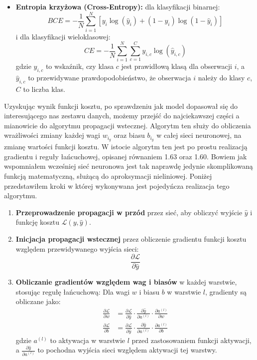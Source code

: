 \begin{enumerate}
\begin{itemize}
    \item \textbf{Entropia krzyżowa (Cross-Entropy):} dla klasyfikacji binarnej:
    \[ BCE = -\frac{1}{N} \sum_{i=1}^{N} [y_i \log(\hat{y}_i) + (1 - y_i) \log(1 - \hat{y}_i)] \]
    i dla klasyfikacji wieloklasowej:
    \[ CE = -\frac{1}{N} \sum_{i=1}^{N} \sum_{c=1}^{C} y_{i,c} \log(\hat{y}_{i,c}) \]
    gdzie $y_{i,c}$ to wskaźnik, czy klasa $c$ jest prawidłową klasą dla obserwacji $i$, a $\hat{y}_{i,c}$ to przewidywane prawdopodobieństwo, że obserwacja $i$ należy do klasy $c$, $C$ to liczba klas.
\end{itemize}
Uzyskując wynik funkcji kosztu, po sprawdzeniu jak model dopasował się do interesującego nas zestawu danych, możemy przejść do najciekawszej części a mianowicie do algorytmu propagacji wstecznej. Algorytm ten służy do obliczenia wrażliwości zmiany każdej wagi $w_i_g$ oraz biasu $b_i_g$ w całej sieci neuronowej, na zmianę wartości funkcji kosztu. W istocie algorytm ten jest po prostu realizacją gradientu i reguły łańcuchowej, opisanej równaniem 1.63 oraz 1.60. Bowiem jak wspomniałem wcześniej sieć neuronowa jest tak naprawdę jedynie skomplikowaną funkcją matematyczną, służącą do aproksymacji nieliniowej. Poniżej przedstawiłem kroki w której wykonywana jest pojedyńcza realizacja tego algorytmu. 
\begin{enumerate}[label=\textbf{Krok \arabic*:}]
    \item \textbf{Przeprowadzenie propagacji w przód} przez sieć, aby obliczyć wyjście \(\hat{y}\) i funkcję kosztu \(\mathcal{L}(y, \hat{y})\).

    \item \textbf{Inicjacja propagacji wstecznej} przez obliczenie gradientu funkcji kosztu względem przewidywanego wyjścia sieci:
    \begin{equation*}
    \frac{\partial \mathcal{L}}{\partial \hat{y}}
    \end{equation*}

    \item \textbf{Obliczanie gradientów względem wag i biasów} w każdej warstwie, stosując regułę łańcuchową:
    Dla wagi \(w\) i biasu \(b\) w warstwie \(l\), gradienty są obliczane jako:
    \begin{align*}
    \frac{\partial \mathcal{L}}{\partial w} &= \frac{\partial \mathcal{L}}{\partial \hat{y}} \cdot \frac{\partial \hat{y}}{\partial a^{(l)}} \cdot \frac{\partial a^{(l)}}{\partial w} \\
    \frac{\partial \mathcal{L}}{\partial b} &= \frac{\partial \mathcal{L}}{\partial \hat{y}} \cdot \frac{\partial \hat{y}}{\partial a^{(l)}} \cdot \frac{\partial a^{(l)}}{\partial b}
    \end{align*}
    gdzie \(a^{(l)}\) to aktywacja w warstwie \(l\) przed zastosowaniem funkcji aktywacji, a \(\frac{\partial \hat{y}}{\partial a^{(l)}}\) to pochodna wyjścia sieci względem aktywacji tej warstwy.


\end{enumerate}
\end{enumerate}
